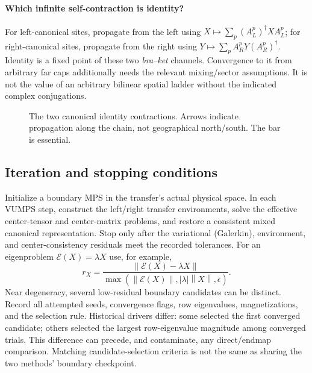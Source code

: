 \documentclass[11pt]{article}
\newcommand{\norm}[1]{\left\lVert#1\right\rVert}
\begin{document}
\paragraph{Which infinite self-contraction is identity?}
For left-canonical sites, propagate from the left using
$X\mapsto\sum_p(A_L^p)^\dagger X A_L^p$; for right-canonical sites,
propagate from the right using $Y\mapsto\sum_p A_R^pY(A_R^p)^\dagger$.
Identity is a fixed point of these two \emph{bra--ket} channels.
Convergence to it from arbitrary far caps additionally needs the relevant
mixing/sector assumptions. It is not the value of an arbitrary bilinear
spatial ladder without the indicated complex conjugations.

\begin{figure}[htbp]\centering
{}
\caption{The two canonical identity contractions. Arrows indicate propagation
along the chain, not geographical north/south. The bar is essential.}
\end{figure}

\subsection{Iteration and stopping conditions}
Initialize a boundary MPS in the transfer's actual physical space. In each
VUMPS step, construct the left/right transfer environments, solve the effective
center-tensor and center-matrix problems, and restore a consistent mixed
canonical representation. Stop only after the variational (Galerkin),
environment, and center-consistency residuals meet the recorded tolerances.
For an eigenproblem $\mathcal E(X)=\lambda X$ use, for example,
\begin{equation}
 r_X=\frac{\norm{\mathcal E(X)-\lambda X}}
 {\max(\norm{\mathcal E(X)},|\lambda|\norm X,\epsilon)}.
\end{equation}
Near degeneracy, several low-residual boundary candidates can be distinct.
Record all attempted seeds, convergence flags, row eigenvalues, magnetizations,
and the selection rule. Historical drivers differ: some selected the first
converged candidate; others selected the largest row-eigenvalue magnitude among
converged trials. This difference can precede, and contaminate, any direct/endmap
comparison. Matching candidate-selection criteria is not the same as sharing
the two methods' boundary checkpoint.
\end{document}
